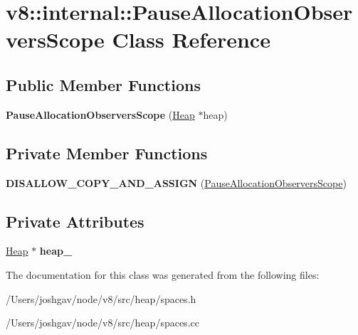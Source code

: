 \hypertarget{classv8_1_1internal_1_1_pause_allocation_observers_scope}{}\section{v8\+:\+:internal\+:\+:Pause\+Allocation\+Observers\+Scope Class Reference}
\label{classv8_1_1internal_1_1_pause_allocation_observers_scope}
\subsection*{Public Member Functions}
\begin{DoxyCompactItemize}
\item 
{\bfseries Pause\+Allocation\+Observers\+Scope} (\hyperlink{classv8_1_1internal_1_1_heap}{Heap} $\ast$heap)\hypertarget{classv8_1_1internal_1_1_pause_allocation_observers_scope_aa86c901cef00d89cf34115ae30700b4d}{}\label{classv8_1_1internal_1_1_pause_allocation_observers_scope_aa86c901cef00d89cf34115ae30700b4d}

\end{DoxyCompactItemize}
\subsection*{Private Member Functions}
\begin{DoxyCompactItemize}
\item 
{\bfseries D\+I\+S\+A\+L\+L\+O\+W\+\_\+\+C\+O\+P\+Y\+\_\+\+A\+N\+D\+\_\+\+A\+S\+S\+I\+GN} (\hyperlink{classv8_1_1internal_1_1_pause_allocation_observers_scope}{Pause\+Allocation\+Observers\+Scope})\hypertarget{classv8_1_1internal_1_1_pause_allocation_observers_scope_ae4e8763e4924dad1793a8e9f050f79b6}{}\label{classv8_1_1internal_1_1_pause_allocation_observers_scope_ae4e8763e4924dad1793a8e9f050f79b6}

\end{DoxyCompactItemize}
\subsection*{Private Attributes}
\begin{DoxyCompactItemize}
\item 
\hyperlink{classv8_1_1internal_1_1_heap}{Heap} $\ast$ {\bfseries heap\+\_\+}\hypertarget{classv8_1_1internal_1_1_pause_allocation_observers_scope_a4c1d05615780418e5a12487df13103dc}{}\label{classv8_1_1internal_1_1_pause_allocation_observers_scope_a4c1d05615780418e5a12487df13103dc}

\end{DoxyCompactItemize}


The documentation for this class was generated from the following files\+:\begin{DoxyCompactItemize}
\item 
/\+Users/joshgav/node/v8/src/heap/spaces.\+h\item 
/\+Users/joshgav/node/v8/src/heap/spaces.\+cc\end{DoxyCompactItemize}
